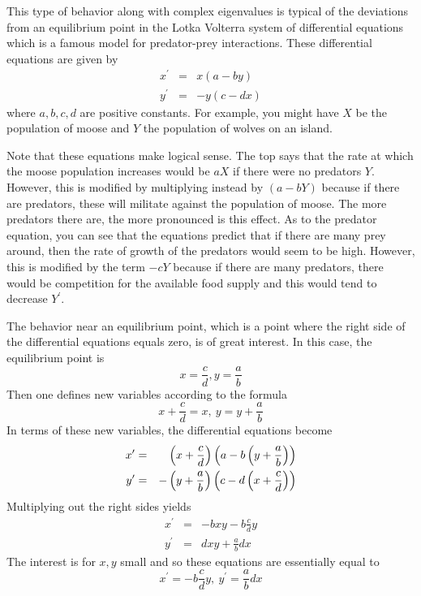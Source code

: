 This type of behavior along with complex eigenvalues is typical of the
deviations from an equilibrium point in the Lotka Volterra system of
differential equations which is a famous model for predator-prey
interactions. These differential equations are given by
\begin{eqnarray*}
x^{\prime } &=&x(a-by) \\
y^{\prime } &=&-y(c-dx)
\end{eqnarray*}
where $a,b,c,d$ are positive constants. For example, you might have $X$ be
the population of moose and $Y$ the population of wolves on an island.

Note that these equations make logical sense. The top says that the rate at which
the moose population increases would be $aX$ if there were no predators $Y$.
However, this is modified by multiplying instead by $(a-bY) $
because if there are predators, these will militate against the population
of moose.  The more predators there
are, the more pronounced is this effect. As to the predator equation, you
can see that the equations predict that if there are many prey around, then
the rate of growth of the predators would seem to be high. However, this is
modified by the term $-cY$ because if there are many predators, there would
be competition for the available food supply and this would tend to decrease
$Y^{\prime }$.

The behavior near an equilibrium point, which is a point where the right
side of the differential equations equals zero, is of great interest. In
this case, the equilibrium point is
\begin{equation*}
x=\frac{c}{d}, y=\frac{a}{b}
\end{equation*}
Then one defines new variables according to the formula
\begin{equation*}
x+\frac{c}{d}=x,\ y=y+\frac{a}{b}
\end{equation*}
In terms of these new variables, the differential equations become
\begin{eqnarray*}
x^{\prime } &=&\left(x+\frac{c}{d}\right) \left(a-b\left(y+\frac{a}{b}
\right)\right) \\
y^{\prime } &=&-\left(y+\frac{a}{b}\right) \left(c-d\left(x+\frac{c}{d}
\right)\right)
\end{eqnarray*}
Multiplying out the right sides yields
\begin{eqnarray*}
x^{\prime } &=&-bxy-b\frac{c}{d}y \\
y^{\prime } &=&dxy+\frac{a}{b}dx
\end{eqnarray*}
The interest is for $x,y$ small and so these equations are essentially equal
to
\begin{equation*}
x^{\prime }=-b\frac{c}{d}y,\ y^{\prime }=\frac{a}{b}dx
\end{equation*}

